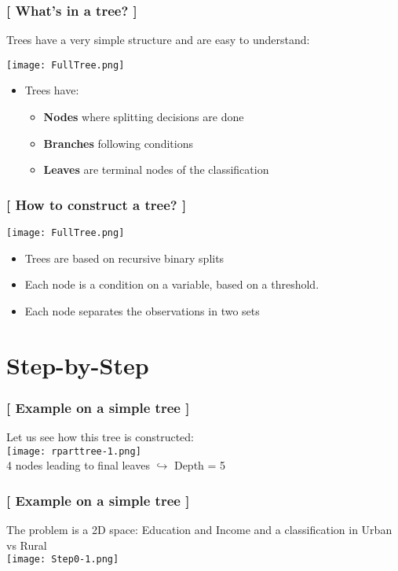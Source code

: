 \documentclass[xcolor=x11names,compress, handhouts]{beamer}
\renewcommand{\(}{\begin{columns}}
\renewcommand{\)}{\end{columns}}
\newcommand{\<}[1]{\begin{column}{#1}}
\renewcommand{\>}{\end{column}}
\begin{document}
\begin{frame} %
\frametitle{\textcolor{brique}{[ What's in a tree? ]}}
Trees have a very simple structure and are easy to understand: 
\begin{center} \texttt{[image: FullTree.png]} \end{center}
\pause
\begin{itemize}[<+->]
  \item[] Trees have:
  \begin{itemize}[<+->]
    \item \textbf{Nodes} where splitting decisions are done
    \item \textbf{Branches}  following conditions
    \item \textbf{Leaves} are terminal nodes of the classification
  \end{itemize}
\end{itemize}
\end{frame}


\begin{frame} 
\frametitle{\textcolor{brique}{[ How to construct a tree? ]}}

\begin{center} \texttt{[image: FullTree.png]} \end{center}
\pause
\begin{itemize}[<+->]
    \item Trees are based on recursive binary splits
    \item Each node is a condition on a variable, based on a threshold. 
    \item Each node separates the observations in two sets 
\end{itemize}
\end{frame}


\section{Step-by-Step}

\begin{frame}
\frametitle{\textcolor{brique}{[ Example on a simple tree ]}}
Let us see how this tree is constructed:\\
\texttt{[image: rparttree-1.png]} \\
4 nodes leading to final leaves $\hookrightarrow$  Depth = 5 
\end{frame}

\begin{frame}
\frametitle{\textcolor{brique}{[ Example on a simple tree ]}}
The problem is a 2D space: Education and Income and a classification in Urban vs Rural\\
\texttt{[image: Step0-1.png]}
\end{frame}
\end{document}
